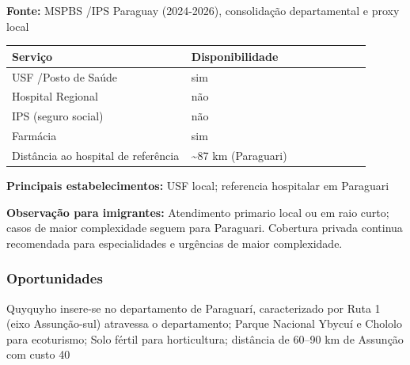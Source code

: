 \textbf{Fonte:} MSPBS /\allowbreak  IPS Paraguay (2024-2026), consolidação
departamental e proxy local

{\def\LTcaptype{none} %
\begin{longtable}{@{}>{\raggedright\arraybackslash}p{0.45\linewidth} >{\raggedright\arraybackslash}p{0.45\linewidth}@{}}
\toprule\noalign{}
Serviço & Disponibilidade \\
\midrule\noalign{}
\endhead
\bottomrule\noalign{}
\endlastfoot
USF /\allowbreak  Posto de Saúde & sim \\
Hospital Regional & não \\
IPS (seguro social) & não \\
Farmácia & sim \\
Distância ao hospital de referência & \textasciitilde87 km
(Paraguari) \\
\end{longtable}
}

\textbf{Principais estabelecimentos:} USF local; referencia hospitalar
em Paraguari

\textbf{Observação para imigrantes:} Atendimento primario local ou em
raio curto; casos de maior complexidade seguem para Paraguari. Cobertura
privada continua recomendada para especialidades e urgências de maior
complexidade.
\newpage

\subsubsection*{Oportunidades}\label{oport-quyquyho-0911}
Quyquyho insere-se no departamento de Paraguarí, caracterizado por Ruta 1 (eixo Assunção-sul) atravessa o departamento; Parque Nacional Ybycuí e Chololo para ecoturismo; Solo fértil para horticultura; distância de 60–90 km de Assunção com custo 40%

